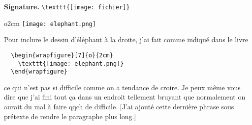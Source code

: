 \documentclass{article}
\begin{document}
\textbf{Signature.} \verb|\texttt{[image: fichier]}|
\vspace{10mm}


\begin{wrapfigure}[7]{o}{2cm}
  \texttt{[image: elephant.png]}
\end{wrapfigure}
Pour inclure le dessin d'éléphant à la droite, j'ai fait comme indiqué dans le livre
\begin{verbatim}
  \begin{wrapfigure}[7]{o}{2cm}
    \texttt{[image: elephant.png]}
  \end{wrapfigure}
\end{verbatim}
ce qui n'est pas si difficile comme on a tendance de croire. Je peux même vous
dire que j'ai fini tout ça dans un endroit tellement bruyant que normalement
on aurait du mal à faire qqch de difficile. [J'ai ajouté cette dernière phrase
sous prétexte de rendre le paragraphe plus long.]
\end{document}
